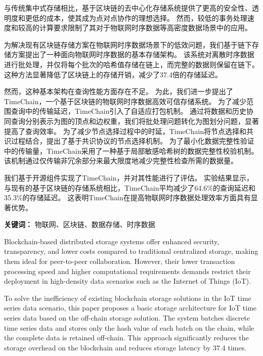 \cleardoublepage
{}
与传统集中式存储相比，基于区块链的去中心化存储系统提供了更高的安全性、透明度和更低的成本，使其成为点对点协作的理想选择。
然而，较低的事务处理速度和较高的计算要求限制了其对于物联网时序数据等高密度数据场景中的应用。

为解决现有区块链存储方案在物联网时序数据场景下的低效问题，我们基于链下存储方案提出了一种面向物联网时序数据的基本存储架构。
该系统对离散时序数据进行批处理，并仅将每个批次的哈希值存储在链上，而完整的数据则保留在链下。
这种方法显著降低了区块链上的存储开销，减少了37.4倍的存储延迟。

然而，这种基本架构在查询性能方面存在不足。
为此，我们进一步提出了TimeChain，一个基于区块链的物联网时序数据高效可信存储系统。
为了减少范围查询中的传输延迟，TimeChain引入了自适应打包机制。
通过将数据和历史协同查询分别表示为图的顶点和边权重，我们将批处理问题转化为图划分问题，显著提高了查询效率。
为了减少节点选择过程中的时延，TimeChain将节点选择和共识过程结合，提出了基于共识协议的节点选择机制。
为了最小化数据完整性验证中的传输量，TimeChain采用了一种基于局部敏感哈希树的数据完整性校验机制。
该机制通过仅传输非冗余部分来最大限度地减少完整性检查所需的数据量。

我们基于开源组件实现了TimeChain，并对其性能进行了评估。
实验结果显示，与现有的基于区块链的存储系统相比，TimeChain平均减少了64.6\%的查询延迟和35.3\%的存储延迟。
这表明TimeChain在提高物联网时序数据处理效率方面具有显著优势。

{\noindent \textbf{关键词：} 物联网、区块链、数据存储、时序数据}

\cleardoublepage
{}
Blockchain-based distributed storage systems offer enhanced security, transparency, and lower costs compared to traditional centralized storage, making them ideal for peer-to-peer collaboration. 
However, their lower transaction processing speed and higher computational requirements demands restrict their deployment in high-density data scenarios such as the Internet of Things (IoT).

To solve the inefficiency of existing blockchain storage solutions in the IoT time series data scenario, this paper proposes a basic storage architecture for IoT time series data based on the off-chain storage solution.
The system batches discrete time series data and stores only the hash value of each batch on the chain, while the complete data is retained off-chain.
This approach significantly reduces the storage overhead on the blockchain and reduces storage latency by 37.4 times.

